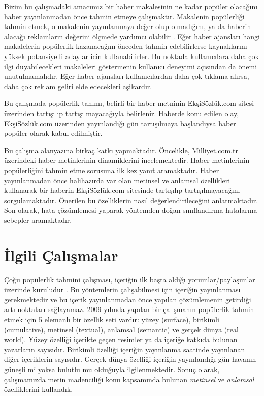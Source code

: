 \documentclass[conference]{IEEEtran}
\begin{document}
Bizim bu çalışmadaki amacımız bir haber makalesinin ne kadar popüler olacağını haber yayınlanmadan önce tahmin etmeye çalışmaktır. Makalenin popülerliği tahmin etmek, o makalenin yayınlanmaya değer olup olmadığını, ya da haberin alacağı reklamların değerini ölçmede yardımcı olabilir \cite{phukan_feasibility_2016}. Eğer haber ajansları hangi makalelerin popülerlik kazanacağını önceden tahmin edebilirlerse kaynaklarını yüksek potansiyelli adaylar icin kullanabilirler. Bu noktada kullanıcılara daha çok ilgi duyabilecekleri makaleleri göstermenin kullanıcı deneyimi açısından da önemi unutulmamalıdır. Eğer haber ajansları kullanıcılardan daha çok tıklama alırsa, daha çok reklam geliri elde edecekleri aşikardır. \cite{bandari_pulse_2012}

Bu çalışmada popülerlik tanımı, belirli bir haber metninin EkşiSözlük.com sitesi üzerinden tartışılıp tartışılmayacağıyla belirlenir. Haberde konu edilen olay, EkşiSözlük.com üzerinden yayınlandığı gün tartışılmaya başlandıysa haber popüler olarak kabul edilmiştir.

Bu çalışma alanyazına birkaç katkı yapmaktadır. Öncelikle, Milliyet.com.tr üzerindeki haber metinlerinin dinamiklerini incelemektedir. Haber metinlerinin popülerliğini tahmin etme sorusuna ilk kez yanıt aramaktadır. Haber yayınlanmadan önce halihazırda var olan metinsel ve anlamsal özellikleri kullanarak bir haberin EkşiSözlük.com sitesinde tartışılıp tartışılmayacağını sorgulamaktadır. Önerilen bu özelliklerin nasıl değerlendirileceğini anlatmaktadır. Son olarak, hata çözümlemesi yaparak yöntemden doğan sınıflandırma hatalarına sebepler aramaktadır.


\section{İlgili Çalışmalar}
Çoğu popülerlik tahmini çalışması, içeriğin ilk başta aldığı yorumlar/paylaşımlar üzerinde kuruludur \cite{szabo_predicting_2010}. Bu yöntemlerin çalışabilmesi için içeriğin yayınlanması gerekmektedir ve bu içerik yayınlanmadan önce yapılan çözümlemenin getirdiği artı noktaları sağlayamaz.
2009 yılında yapılan bir çalışmanın \cite{tsagkias_predicting_2009} popülerlik tahmin etmek için 5 elemanlı bir özellik seti vardır: yüzey (surface), birikimli (cumulative), metinsel (textual), anlamsal (semantic) ve gerçek dünya (real world). Yüzey özelliği içerikte geçen resimler ya da içeriğe katkıda bulunan yazarların sayısıdır. Birikimli özelliği içeriğin yayınlanma saatinde yayınlanan diğer içeriklerin sayısıdır. Gerçek dünya özelliği içeriğin yayınlandığı gün havanın güneşli mi yoksa bulutlu mu olduğuyla ilgilenmektedir. Sonuç olarak, çalışmamızda metin madenciliği konu kapsamında bulunan \emph{metinsel} ve \emph{anlamsal} özelliklerini kullandık.
\end{document}
